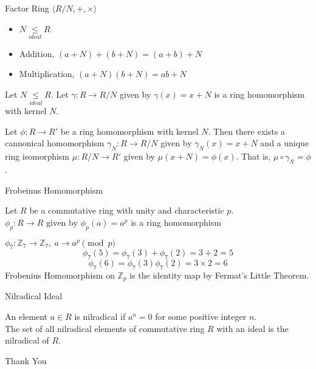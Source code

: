 \documentclass{beamer}
\newcommand{\subgroup}{\le}
\begin{document}
\begin{frame}{Factor Ring $\langle R/N,+,\times\rangle$}
\begin{itemize}
	\item $N \underset{ideal}{\subgroup} R$
	\item Addition, $(a+N)+(b+N) = (a+b)+N$
	\item Multiplication, $(a+N)(b+N) = ab + N$
\end{itemize}
\begin{theorem}
	Let $N \underset{ideal}{\subgroup} R$. Let $\gamma : R \to R/N$ given by $\gamma(x) = x+N$ is a ring homomorphism with kernel $N$.
\end{theorem}
\begin{theorem}
	Let $\phi : R \to R'$ be a ring homomorphism with kernel $N$. Then there exists a cannonical homomorphism $\gamma_N : R \to R/N$ given by $\gamma_N(x) = x+N$ and a unique ring isomorphism $\mu : R/N \to R'$ given by $\mu(x+N) = \phi(x)$. That is, $\mu \circ \gamma_N = \phi$.
\end{theorem}
\end{frame}

\begin{frame}{Frobeinus Homomorphism}
\begin{definition}
	Let $R$ be a commutative ring with unity and characteristic $p$.
	$\phi_p : R \to R \text{ given by } \phi_p(a) = a^p$ is a ring homomorphism
\end{definition}
	\begin{exampleblock}{$\phi_7 : \mathbb{Z}_7 \to \mathbb{Z}_7,\ a \to a^p \pmod{p}$}
	$$\phi_7(5) = \phi_7(3)+\phi_7(2) = 3+2 = 5$$
	$$\phi_7(6) = \phi_7(3)\phi_7(2) = 3 \times 2 = 6$$
	Frobenius Homomorphism on $\mathbb{Z}_p$ is the identity map by Fermat's Little Theorem.
\end{exampleblock}
\end{frame}

\begin{frame}{Nilradical Ideal}
\begin{definition}[Nilradical]
	An element $a \in R$ is nilradical if $a^n = 0$ for some positive integer $n$.\\
	The set of all nilradical elements of commutative ring $R$ with an ideal is the nilradical of $R$.
\end{definition}
\end{frame}

\begin{frame}
	\vspace{0.6in}
	\hspace{3cm} {\color{blue}\Huge{Thank You}}
\end{frame}
\end{document}

